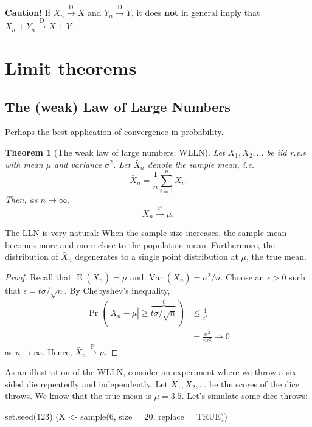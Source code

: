 \documentclass[
]{book}
\newenvironment{Shaded}{\begin{snugshade}}{\end{snugshade}}
\newcommand{\AttributeTok}[1]{\textcolor[rgb]{0.77,0.63,0.00}{#1}}
\newcommand{\ConstantTok}[1]{\textcolor[rgb]{0.00,0.00,0.00}{#1}}
\newcommand{\DecValTok}[1]{\textcolor[rgb]{0.00,0.00,0.81}{#1}}
\newcommand{\FunctionTok}[1]{\textcolor[rgb]{0.00,0.00,0.00}{#1}}
\newcommand{\NormalTok}[1]{#1}
\newcommand{\OtherTok}[1]{\textcolor[rgb]{0.56,0.35,0.01}{#1}}
\DeclareMathOperator{\E}{E}
\DeclareMathOperator{\Var}{Var}
\newtheorem{theorem}{Theorem}[chapter]
\theoremstyle{definition}
\theoremstyle{definition}
\theoremstyle{definition}
\theoremstyle{definition}
\theoremstyle{remark}
\begin{document}
\textbf{Caution!} If \(X_n{\xrightarrow{\text{D}}} X\) and
\(Y_n{\xrightarrow{\text{D}}} Y\), it does \textbf{not} in general imply that
\(X_n+Y_n{\xrightarrow{\text{D}}} X+Y\).

\hypertarget{limit-theorems}{%
\section{Limit theorems}\label{limit-theorems}}

\hypertarget{the-weak-law-of-large-numbers}{%
\subsection{The (weak) Law of Large Numbers}\label{the-weak-law-of-large-numbers}}

Perhaps the best application of convergence in probability.

\begin{theorem}[The weak law of large numbers; WLLN]
Let \(X_1,X_2,\dots\) be iid r.v.s with mean \(\mu\) and variance \(\sigma^2\).
Let \(\bar X_n\) denote the sample mean, i.e.~\[\bar X_n = \frac{1}{n}\sum_{i=1}^n X_i.\]
Then, as \(n\to\infty\),
\[\bar X_n{\xrightarrow{\text{P}}} \mu.\]
\end{theorem}

The LLN is very natural: When the sample size increases, the sample mean
becomes more and more close to the population mean. Furthermore, the
distribution of \(\bar X_n\) degenerates to a single point distribution at \(\mu\), the true mean.

\begin{proof}
Recall that \(\E(\bar X_n)=\mu\) and \(\Var(\bar X_n) = \sigma^2/n\).
Choose an \(\epsilon >0\) such that \(\epsilon=t\sigma/\sqrt{n}\).
By Chebyshev's inequality,
\begin{align*}
\Pr(|\bar X_n - \mu| \geq \overbrace{t\sigma/\sqrt{n}}^{\epsilon}) 
&\leq \frac{1}{t^2}\\
&=\frac{\sigma^2}{n\epsilon^2} \to 0
\end{align*}
as \(n\to\infty\).
Hence, \(\bar X_n{\xrightarrow{\text{P}}} \mu\).
\end{proof}

As an illustration of the WLLN, consider an experiment where we throw a six-sided die repeatedly and independently.
Let \(X_1,X_2,\dots\) be the scores of the dice throws.
We know that the true mean is \(\mu=3.5\).
Let's simulate some dice throws:

\begin{Shaded}
\begin{Highlighting}[]
\FunctionTok{set.seed}\NormalTok{(}\DecValTok{123}\NormalTok{)}
\NormalTok{(X }\OtherTok{\textless{}{-}} \FunctionTok{sample}\NormalTok{(}\DecValTok{6}\NormalTok{, }\AttributeTok{size =} \DecValTok{20}\NormalTok{, }\AttributeTok{replace =} \ConstantTok{TRUE}\NormalTok{))}
\end{Highlighting}
\end{Shaded}
\end{document}
